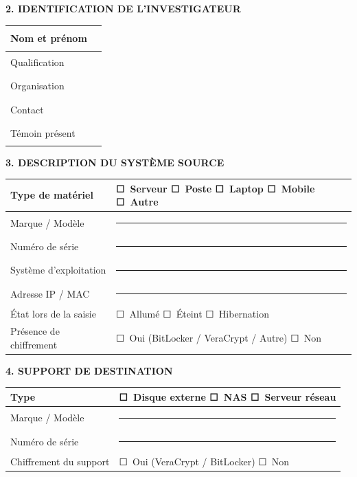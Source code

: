 \textbf{2. IDENTIFICATION DE L'INVESTIGATEUR}

\begin{table}[H]\centering\small
\begin{tabular}{p{5cm}p{8.5cm}}
\toprule
Nom et prénom & \rule{8.5cm}{0.4pt} \\
\midrule
Qualification & \rule{8.5cm}{0.4pt} \\
Organisation & \rule{8.5cm}{0.4pt} \\
Contact & \rule{8.5cm}{0.4pt} \\
Témoin présent & \rule{8.5cm}{0.4pt} \\
\bottomrule
\end{tabular}
\end{table}

\textbf{3. DESCRIPTION DU SYSTÈME SOURCE}

\begin{table}[H]\centering\small
\begin{tabular}{p{5cm}p{8.5cm}}
\toprule
Type de matériel & ☐~Serveur \quad ☐~Poste \quad ☐~Laptop \quad ☐~Mobile \quad ☐~Autre \\
\midrule
Marque / Modèle & \rule{8.5cm}{0.4pt} \\
Numéro de série & \rule{8.5cm}{0.4pt} \\
Système d'exploitation & \rule{8.5cm}{0.4pt} \\
Adresse IP / MAC & \rule{8.5cm}{0.4pt} \\
État lors de la saisie & ☐~Allumé \quad ☐~Éteint \quad ☐~Hibernation \\
Présence de chiffrement & ☐~Oui (BitLocker / VeraCrypt / Autre) \quad ☐~Non \\
\bottomrule
\end{tabular}
\end{table}

\textbf{4. SUPPORT DE DESTINATION}

\begin{table}[H]\centering\small
\begin{tabular}{p{5cm}p{8.5cm}}
\toprule
Type & ☐~Disque externe \quad ☐~NAS \quad ☐~Serveur réseau \\
\midrule
Marque / Modèle & \rule{8.5cm}{0.4pt} \\
Numéro de série & \rule{8.5cm}{0.4pt} \\
Chiffrement du support & ☐~Oui (VeraCrypt / BitLocker) \quad ☐~Non \\
\bottomrule
\end{tabular}
\end{table}

